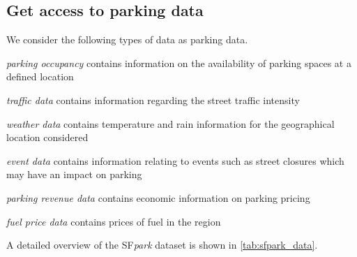 	\subsection{Get access to parking data}
	We consider the following types of data as parking data. 
	\begin{romanlist}
		\item \textit{parking occupancy} contains information on the availability of parking spaces at a defined location
		\item \textit{traffic data} contains information regarding the street traffic intensity
		\item \textit{weather data} contains temperature and rain information for the geographical location considered
		\item \textit{event data} contains information relating to events such as street closures which may have an impact on parking
		\item \textit{parking revenue data} contains economic information on parking pricing
		\item \textit{fuel price data} contains prices of fuel in the region
	\end{romanlist}
	
	A detailed overview of the SF\textit{park} dataset is shown in \cref{tab:sfpark_data}.
	
